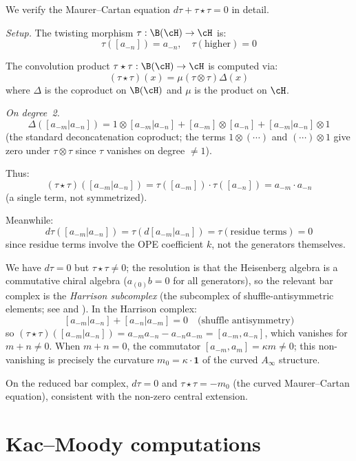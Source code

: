 \begin{computation}\label{comp:heisenberg-mc-deg4}
We verify the Maurer--Cartan equation $d\tau + \tau \star \tau = 0$ in detail.

\emph{Setup.} The twisting morphism $\tau: \B(\cH) \to \cH$ is:
\[
\tau([a_{-n}]) = a_{-n}, \quad \tau(\text{higher}) = 0
\]

The convolution product $\tau \star \tau: \B(\cH) \to \cH$ is computed via:
\[
(\tau \star \tau)(x) = \mu(\tau \otimes \tau)\Delta(x)
\]
where $\Delta$ is the coproduct on $\B(\cH)$ and $\mu$ is the product on $\cH$.

\emph{On degree~2.}
\[
\Delta([a_{-m}|a_{-n}]) = 1 \otimes [a_{-m}|a_{-n}] + [a_{-m}] \otimes [a_{-n}] + [a_{-m}|a_{-n}] \otimes 1
\]
(the standard deconcatenation coproduct; the terms $1 \otimes (\cdots)$ and $(\cdots) \otimes 1$ give zero under $\tau \otimes \tau$ since $\tau$ vanishes on degree $\neq 1$).

Thus:
\[
(\tau \star \tau)([a_{-m}|a_{-n}]) = \tau([a_{-m}]) \cdot \tau([a_{-n}]) = a_{-m} \cdot a_{-n}
\]
(a single term, not symmetrized).

Meanwhile:
\[
d\tau([a_{-m}|a_{-n}]) = \tau(d[a_{-m}|a_{-n}]) = \tau(\text{residue terms}) = 0
\]
since residue terms involve the OPE coefficient $k$, not the generators themselves.

We have $d\tau = 0$ but $\tau \star \tau \neq 0$; the resolution is that the Heisenberg algebra is a commutative chiral algebra ($a_{(0)}b = 0$ for all generators), so the relevant bar complex is the \emph{Harrison subcomplex} (the subcomplex of shuffle-antisymmetric elements; see \cite[Section~4.2]{LV12} and \cite{Loday98}).  In the Harrison complex:
\[
[a_{-m}|a_{-n}] + [a_{-n}|a_{-m}] = 0 \quad \text{(shuffle antisymmetry)}
\]
so $(\tau \star \tau)([a_{-m}|a_{-n}]) = a_{-m}a_{-n} - a_{-n}a_{-m} = [a_{-m}, a_{-n}]$,
which vanishes for $m + n \neq 0$.  When $m + n = 0$, the commutator
$[a_{-m}, a_m] = \kappa m \neq 0$; this non-vanishing is precisely the curvature
$m_0 = \kappa \cdot \mathbf{1}$ of the curved $A_\infty$ structure.

On the reduced bar complex, $d\tau = 0$ and
$\tau \star \tau = -m_0$ (the curved Maurer--Cartan equation), consistent with
the non-zero central extension.
\end{computation}


\section{Kac--Moody computations}
\label{sec:km-details}


